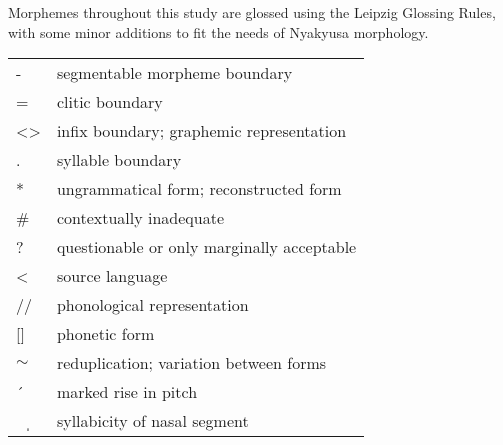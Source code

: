 

Morphemes throughout this study are glossed using the Leipzig Glossing Rules, with some minor additions to fit the needs of Nyakyusa morphology.\\

\begin{tabular}[h]{ll}
- & segmentable morpheme boundary\\
= & clitic boundary\\
<> & infix boundary; graphemic representation\\
. & syllable boundary\\
* & ungrammatical form; reconstructed form\\
\# & contextually inadequate\\
? & questionable or only marginally acceptable\\
< & source language\\
// & phonological representation\\
{[]} & phonetic form\\
$\sim $& reduplication; variation between forms\\
´ & marked rise in pitch\\%
~ ̩ & syllabicity of nasal segment
\end{tabular}
\vspace{\baselineskip}



